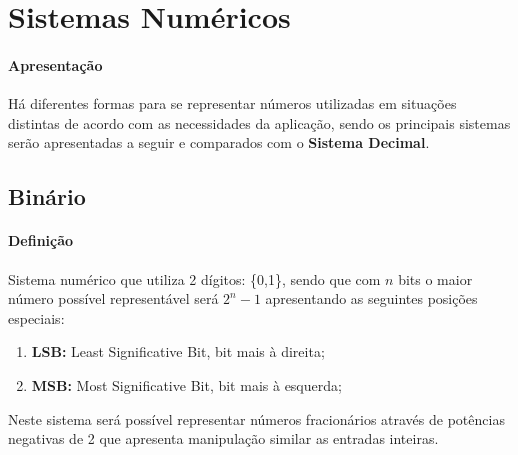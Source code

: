 \documentclass{article}
\begin{document}
    \section{Sistemas Numéricos}
        \paragraph{Apresentação}Há diferentes formas para se representar números utilizadas em situações distintas de acordo com as necessidades da aplicação, sendo os principais sistemas serão apresentadas a seguir e comparados com o \textbf{Sistema Decimal}.

        \subsection{Binário}
            \paragraph{Definição}Sistema numérico que utiliza 2 dígitos: \{0,1\}, sendo que com $n$ bits o maior número possível representável será $2^{n}-1$ apresentando as seguintes posições especiais:
                \begin{enumerate}[noitemsep]
                    \item \textbf{LSB:} Least Significative Bit, bit mais à direita;
                    \item \textbf{MSB:} Most Significative Bit, bit mais à esquerda;
                \end{enumerate}
            Neste sistema será possível representar números fracionários através de potências negativas de 2 que apresenta manipulação similar as entradas inteiras.
\end{document}
